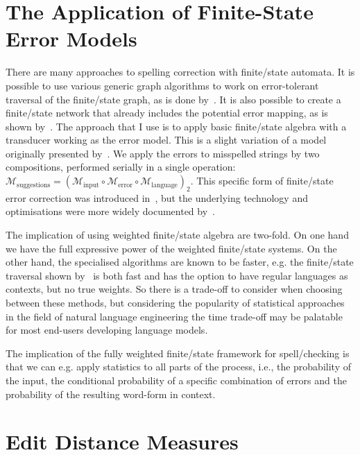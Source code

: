 \documentclass[officiallayout,final]{unihelcompling}
\begin{document}
\section{The Application of Finite-State Error Models}
\label{sec:error-application}

There are many approaches to spelling correction with finite\-/state automata.
It is possible to use various generic graph algorithms to work on
error-tolerant traversal of the finite\-/state graph, as is done
by~\citet{hulden2009fast}.  It is also possible to create a finite\-/state
network that already includes the potential error mapping, as is shown
by~\citet{schulz2002fast}. The approach that I use is to apply basic
finite\-/state algebra with a transducer working as the error model. This is a
slight variation of a model originally presented by~\citet{mohri2003edit}. We
apply the errors to misspelled strings by two compositions, performed serially
in a single operation: $\mathcal{M}_{\mathrm{suggestions}} =
(\mathcal{M}_{\mathrm{input}} \circ \mathcal{M}_{\mathrm{error}} \circ
\mathcal{M}_{\mathrm{language}})_2$.  This specific form of finite\-/state
error correction was introduced in~, but the
underlying technology and optimisations were more widely documented
by~\citet{linden2011hfst}.

The implication of using weighted finite\-/state algebra are two-fold. On one
hand we have the full expressive power of the weighted finite\-/state
systems.  On the other hand, the specialised algorithms are known to be faster,
e.g.  the finite\-/state traversal shown by~\citet{hulden2009fast} is both fast
and has the option to have regular languages as contexts, but no true weights.
So there is a trade-off to consider when choosing between these methods, but
considering the popularity of statistical approaches in the field of natural
language engineering the time trade-off may be palatable for most end-users
developing language models.

The implication of the fully weighted finite\-/state framework for
spell\-/checking is that we can e.g. apply statistics to all parts of the
process, i.e., the probability of the input, the conditional probability of a
specific combination of errors and the probability of the resulting word-form
in context. 

\section{Edit Distance Measures}
\label{sec:edit-distance}
\end{document}
